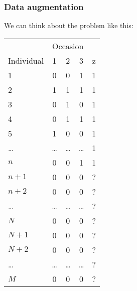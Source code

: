 \documentclass[color=usenames,dvipsnames]{beamer}\usepackage[]{graphicx}\usepackage[]{xcolor}
\begin{document}
\begin{frame}
  \frametitle{Data augmentation}
  \footnotesize
  We can think about the problem like this: \\
  \centering
  \vfill
  \begin{tabular}{lcccc}
    \hline
               & \multicolumn{3}{c}{Occasion} \\
    \cline{2-4}
    Individual & 1     & 2     & 3     & z    \\
    \hline
    1          & 0     & 0     & 1     & 1    \\
    2          & 1     & 1     & 1     & 1            \\
    3          & 0     & 1     & 0     & 1            \\
    4          & 0     & 1     & 1     & 1            \\
    5          & 1     & 0     & 0     & 1            \\
    \dots      & \dots & \dots & \dots      & 1        \\
    $n$        & 0     & 0     & 1     & 1            \\
    \hline
    $n+1$      & 0     & 0     & 0     & ?            \\
    $n+2$      & 0     & 0     & 0     & ?            \\
    \dots      & \dots & \dots & \dots     & ?        \\
    $N$        & 0     & 0     & 0     & ?            \\
    \hline
    $N+1$      & 0     & 0     & 0     & ?            \\
    $N+2$      & 0     & 0     & 0     & ?            \\
    \dots      & \dots & \dots & \dots     & ?        \\
    $M$      & 0     & 0     & 0     & ?            \\
    \hline
  \end{tabular}
\end{frame}
\end{document}
